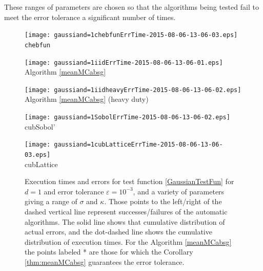 \documentclass{iitthesis}
\begin{document}
These ranges of parameters are chosen so that the algorithms being tested fail to meet the error tolerance a significant number of times.
\begin{figure}
\centering
\begin{minipage}{6.7cm} \centering \texttt{[image: gaussiand=1chebfunErrTime-2015-08-06-13-06-03.eps]} \\ {\tt chebfun} \end{minipage}
\begin{minipage}{6.7cm} \centering \texttt{[image: gaussiand=1iidErrTime-2015-08-06-13-06-01.eps]} \\ Algorithm \ref{meanMCabsg}  \end{minipage}
\begin{minipage}{6.7cm} \centering \texttt{[image: gaussiand=1iidheavyErrTime-2015-08-06-13-06-02.eps]} \\ Algorithm \ref{meanMCabsg} (heavy duty)\end{minipage}
\begin{minipage}{6.7cm} \centering \texttt{[image: gaussiand=1SobolErrTime-2015-08-06-13-06-02.eps]} \\  cubSobol'\end{minipage}
\begin{minipage}{5.7cm} \centering \texttt{[image: gaussiand=1cubLatticeErrTime-2015-08-06-13-06-03.eps]} \\ cubLattice \end{minipage}
\caption{Execution times and errors for test function \eqref{GaussianTestFun} for $d=1$ and error tolerance $\varepsilon=10^{-3}$, and a variety of parameters giving a range of $\sigma$ and $\kappa$. Those points to the left/right of the dashed 
vertical line 
represent successes/failures of the automatic algorithms.  The solid line shows that cumulative distribution of actual errors, and the dot-dashed line shows the cumulative distribution of execution times.  For the Algorithm \ref{meanMCabsg} the points labeled * are those for which the Corollary \ref{thm:meanMCabsg} guarantees the error tolerance.\label{GaussianTestFunFig} }
\end{figure}
\end{document}
